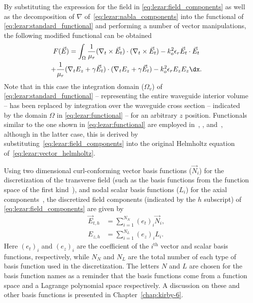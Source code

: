 
By substituting the expression for the field in
\eqref{eq:lezar:field_components} as well as the decomposition of
$\nabla$ of~\eqref{eq:lezar:nabla_components} into the functional of
\eqref{eq:lezar:standard_functional} and performing a number of vector
manipulations, the following modified functional can be obtained
\begin{multline}
    \label{eq:lezar:functional}
    F(\vec{E}) = \int_{\Omega}\frac{1}{\mu_r}(\nabla_t\times{\vec{E}_t})\cdot(\nabla_t\times{\vec{E}_t})
    - k_o^2\epsilon_r\vec{E}_t\cdot{\vec{E}_t}\\
    +\frac{1}{\mu_r}(\nabla_t{E_z} + \gamma\vec{E}_t)\cdot(\nabla_t{E_z} + \gamma\vec{E}_t)
    -k_o^2\epsilon_r E_z{E_z} \dx.
\end{multline}
Note that in this case the integration domain ($\Omega_v$) of
\eqref{eq:lezar:standard_functional} -- representing the entire
waveguide interior volume -- has been replaced by integration over
the waveguide cross section -- indicated by the domain $\Omega$ in
\eqref{eq:lezar:functional} -- for an arbitrary $z$ position. Functionals
similar to the one shown in \eqref{eq:lezar:functional}
are employed in~\citet{LeeSunCendes1991}, \citet{Jin2002},
and~\citet{PelosiCoccioliSelleri1998}, although in the latter case,
this is derived by substituting~\eqref{eq:lezar:field_components} into
the original Helmholtz equation of~\eqref{eq:lezar:vector_helmholtz}.

Using two dimensional curl-conforming vector basis functions
($\vec{N}_i$) for the discretization of the transverse field (such as
the basis functions from the \nedelec{} function space of the first
kind~\citep{Nedelec1980, Webb1993, Monk2003}), and nodal scalar basis
functions ($L_i$) for the axial components~\citep{Jin2002,
PelosiCoccioliSelleri1998}, the discretized field components
(indicated by the $h$ subscript) of \eqref{eq:lezar:field_components}
are given by~\citep{Jin2002, PelosiCoccioliSelleri1998}
\begin{align}
  \label{eq:lezar:E_t_discretized}
  \vec{E}_{t,h} &= \sum_{i=1}^{N_N} (e_t)_i \vec{N}_i,\\
  \label{eq:lezar:E_z_discretized}
  E_{z,h} &= \sum_{i=1}^{N_L} (e_z)_i L_i.
\end{align}
Here $(e_t)_i$ and $(e_z)_i$ are the coefficient of the $i^\text{th}$
vector and scalar basis functions, respectively, while $N_N$ and $N_L$
are the total number of each type of basis function used in the
discretization. The letters $N$ and $L$ are chosen for the basis
function names as a reminder that the basis functions come from
a \nedelec{} function space and a Lagrange polynomial space
respectively. A discussion on these and other basis functions is
presented in Chapter~\ref{chap:kirby-6}.


